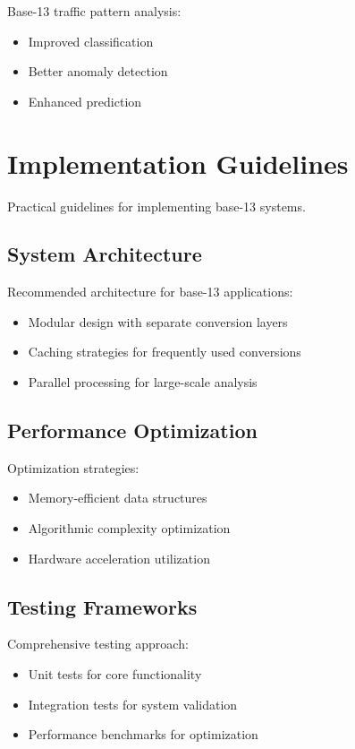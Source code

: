 \documentclass[12pt,a4paper]{report}
\begin{document}
Base-13 traffic pattern analysis:
\begin{itemize}
\item Improved classification
\item Better anomaly detection
\item Enhanced prediction
\end{itemize}

\section{Implementation Guidelines}

Practical guidelines for implementing base-13 systems.

\subsection{System Architecture}

Recommended architecture for base-13 applications:
\begin{itemize}
\item Modular design with separate conversion layers
\item Caching strategies for frequently used conversions
\item Parallel processing for large-scale analysis
\end{itemize}

\subsection{Performance Optimization}

Optimization strategies:
\begin{itemize}
\item Memory-efficient data structures
\item Algorithmic complexity optimization
\item Hardware acceleration utilization
\end{itemize}

\subsection{Testing Frameworks}

Comprehensive testing approach:
\begin{itemize}
\item Unit tests for core functionality
\item Integration tests for system validation
\item Performance benchmarks for optimization
\end{itemize}
\end{document}
